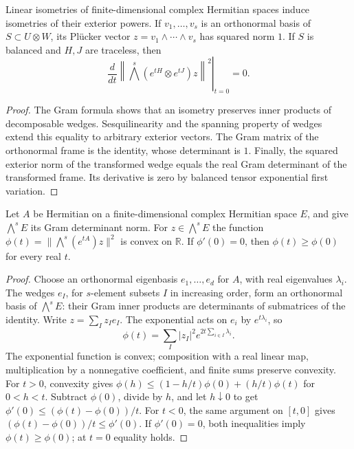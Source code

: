 \begin{lemma}
\label{lem:balanced-plucker-norm-variation}
\leanok
Linear isometries of finite-dimensional complex Hermitian spaces induce
isometries of their exterior powers. If $v_1,\ldots,v_s$ is an orthonormal
basis of $S\subset U\otimes W$, its Pl\"ucker vector
$z=v_1\wedge\cdots\wedge v_s$ has squared norm $1$.
If $S$ is balanced and $H,J$ are traceless, then
\[
 \left.\frac{d}{dt}\left\|\bigwedge^s(e^{tH}\otimes e^{tJ})z\right\|^2
 \right|_{t=0}=0.
\]
\end{lemma}
\begin{proof}
The Gram formula shows that an isometry preserves inner products of
decomposable wedges. Sesquilinearity and the spanning property of wedges
extend this equality to arbitrary exterior vectors. The Gram matrix of
the orthonormal frame is the identity, whose determinant is $1$.
Finally, the squared exterior norm of the transformed wedge equals the
real Gram determinant of the transformed frame. Its derivative is zero
by balanced tensor exponential first variation.
\end{proof}

\begin{lemma}
\label{lem:balanced-exponential-convexity}
\leanok
{}
Let $A$ be Hermitian on a finite-dimensional complex Hermitian space
$E$, and give $\bigwedge^sE$ its Gram determinant norm. For
$z\in\bigwedge^sE$ the function
$\phi(t)=\|\bigwedge^s(e^{tA})z\|^2$ is convex on $\mathbb R$.
If $\phi'(0)=0$, then $\phi(t)\geq\phi(0)$ for every real $t$.
\end{lemma}
\begin{proof}
Choose an orthonormal eigenbasis $e_1,\ldots,e_d$ for $A$, with
real eigenvalues $\lambda_i$. The wedges $e_I$, for $s$-element
subsets $I$ in increasing order, form an orthonormal basis of
$\bigwedge^sE$: their Gram inner products are determinants of submatrices
of the identity. Write $z=\sum_I z_I e_I$. The exponential acts on
$e_i$ by $e^{t\lambda_i}$, so
\[
 \phi(t)=\sum_I |z_I|^2 e^{2t\sum_{i\in I}\lambda_i}.
\]
The exponential function is convex; composition with a real linear map,
multiplication by a nonnegative coefficient, and finite sums preserve
convexity. For $t>0$, convexity gives
$\phi(h)\leq(1-h/t)\phi(0)+(h/t)\phi(t)$ for $0<h<t$.
Subtract $\phi(0)$, divide by $h$, and let $h\downarrow0$ to get
$\phi'(0)\leq(\phi(t)-\phi(0))/t$. For $t<0$, the same argument
on $[t,0]$ gives $(\phi(t)-\phi(0))/t\leq\phi'(0)$.
If $\phi'(0)=0$, both inequalities imply $\phi(t)\geq\phi(0)$;
at $t=0$ equality holds.
\end{proof}

